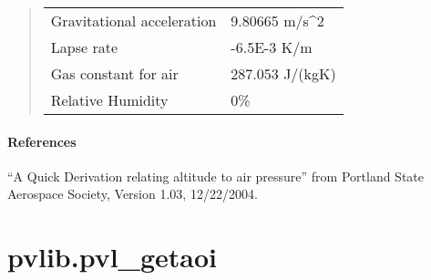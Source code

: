 \documentclass[letterpaper,10pt,english]{sphinxmanual}
\begin{document}
\begin{fulllineitems}
\begin{quote}
\begin{tabulary}{\linewidth}{|L|L|}
Gravitational acceleration
 & 
9.80665 m/s\textasciicircum{}2
\\

Lapse rate
 & 
-6.5E-3 K/m
\\

Gas constant for air
 & 
287.053 J/(kgK)
\\

Relative Humidity
 & 
0\%
\\
\hline\end{tabulary}

\end{quote}
\paragraph{References}

``A Quick Derivation relating altitude to air pressure'' from Portland
State Aerospace Society, Version 1.03, 12/22/2004.

\end{fulllineitems}



\section{pvlib.pvl\_getaoi}
\label{stubs/pvlib.pvl_getaoi:pvlib-pvl-getaoi}\label{stubs/pvlib.pvl_getaoi::doc}
\end{document}
